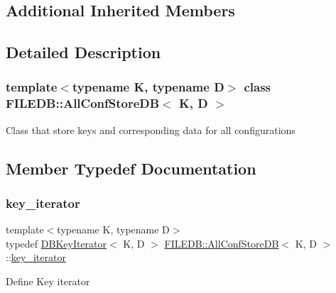 \subsection*{Additional Inherited Members}


\subsection{Detailed Description}
\subsubsection*{template$<$typename K, typename D$>$\newline
class F\+I\+L\+E\+D\+B\+::\+All\+Conf\+Store\+D\+B$<$ K, D $>$}

Class that store keys and corresponding data for all configurations 

\subsection{Member Typedef Documentation}
\mbox{\label{classFILEDB_1_1AllConfStoreDB_a2ce8981ca7049ed0c2c6e438873a9c1b}} 
\subsubsection{\texorpdfstring{key\_iterator}{key\_iterator}\hspace{0.1cm}{\footnotesize\ttfamily [1/3]}}
{\footnotesize\ttfamily template$<$typename K, typename D$>$ \\
typedef \mbox{\hyperlink{classFILEDB_1_1DBKeyIterator}{D\+B\+Key\+Iterator}}$<$ K, D $>$ \mbox{\hyperlink{classFILEDB_1_1AllConfStoreDB}{F\+I\+L\+E\+D\+B\+::\+All\+Conf\+Store\+DB}}$<$ K, D $>$\+::\mbox{\hyperlink{classFILEDB_1_1AllConfStoreDB_a2ce8981ca7049ed0c2c6e438873a9c1b}{key\+\_\+iterator}}}

Define Key iterator \mbox{\label{classFILEDB_1_1AllConfStoreDB_a2ce8981ca7049ed0c2c6e438873a9c1b}} 
